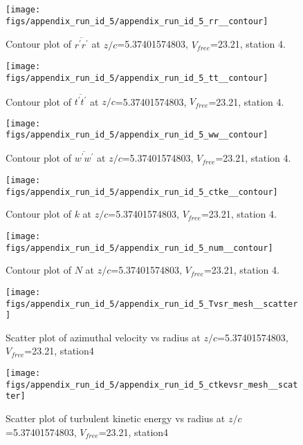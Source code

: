 \begin{figure}[H]
\centering
\texttt{[image: figs/appendix\_run\_id\_5/appendix\_run\_id\_5\_rr\_\_contour]}
\caption{Contour plot of $\overline{r^\prime r^\prime}$ at $z/c$=5.37401574803, $V_{free}$=23.21, station 4.}
\label{fig:appendix_run_id_5_rr__contour}
\end{figure}


\begin{figure}[H]
\centering
\texttt{[image: figs/appendix\_run\_id\_5/appendix\_run\_id\_5\_tt\_\_contour]}
\caption{Contour plot of $\overline{t^\prime t^\prime}$ at $z/c$=5.37401574803, $V_{free}$=23.21, station 4.}
\label{fig:appendix_run_id_5_tt__contour}
\end{figure}


\begin{figure}[H]
\centering
\texttt{[image: figs/appendix\_run\_id\_5/appendix\_run\_id\_5\_ww\_\_contour]}
\caption{Contour plot of $\overline{w^\prime w^\prime}$ at $z/c$=5.37401574803, $V_{free}$=23.21, station 4.}
\label{fig:appendix_run_id_5_ww__contour}
\end{figure}


\begin{figure}[H]
\centering
\texttt{[image: figs/appendix\_run\_id\_5/appendix\_run\_id\_5\_ctke\_\_contour]}
\caption{Contour plot of $k$ at $z/c$=5.37401574803, $V_{free}$=23.21, station 4.}
\label{fig:appendix_run_id_5_ctke__contour}
\end{figure}


\begin{figure}[H]
\centering
\texttt{[image: figs/appendix\_run\_id\_5/appendix\_run\_id\_5\_num\_\_contour]}
\caption{Contour plot of $N$ at $z/c$=5.37401574803, $V_{free}$=23.21, station 4.}
\label{fig:appendix_run_id_5_num__contour}
\end{figure}


\begin{figure}[H]
\centering
\texttt{[image: figs/appendix\_run\_id\_5/appendix\_run\_id\_5\_Tvsr\_mesh\_\_scatter]}
\caption{Scatter plot of azimuthal velocity vs radius at $z/c$=5.37401574803, $V_{free}$=23.21, station4}
\label{fig:appendix_run_id_5_Tvsr_mesh__scatter}
\end{figure}


\begin{figure}[H]
\centering
\texttt{[image: figs/appendix\_run\_id\_5/appendix\_run\_id\_5\_ctkevsr\_mesh\_\_scatter]}
\caption{Scatter plot of turbulent kinetic energy vs radius at $z/c$=5.37401574803, $V_{free}$=23.21, station4}
\label{fig:appendix_run_id_5_ctkevsr_mesh__scatter}
\end{figure}


